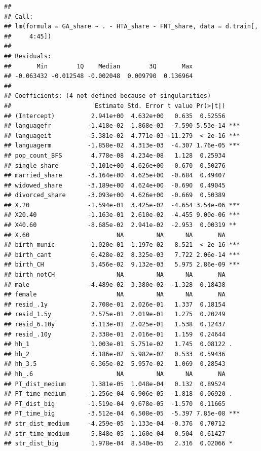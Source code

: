 \documentclass[
]{article}
\begin{document}
\begin{verbatim}
## 
## Call:
## lm(formula = GA_share ~ . - HTA_share - FNT_share, data = d.train[, 
##     4:45])
## 
## Residuals:
##       Min        1Q    Median        3Q       Max 
## -0.063432 -0.012548 -0.002048  0.009790  0.136964 
## 
## Coefficients: (4 not defined because of singularities)
##                       Estimate Std. Error t value Pr(>|t|)    
## (Intercept)          2.941e+00  4.632e+00   0.635  0.52556    
## languagefr          -1.418e-02  1.868e-03  -7.590 5.53e-14 ***
## languageit          -5.381e-02  4.771e-03 -11.279  < 2e-16 ***
## languagerm          -1.858e-02  4.313e-03  -4.307 1.76e-05 ***
## pop_count_BFS        4.778e-08  4.234e-08   1.128  0.25934    
## single_share        -3.101e+00  4.626e+00  -0.670  0.50276    
## married_share       -3.164e+00  4.625e+00  -0.684  0.49407    
## widowed_share       -3.189e+00  4.624e+00  -0.690  0.49045    
## divorced_share      -3.093e+00  4.626e+00  -0.669  0.50389    
## X.20                -1.594e-01  3.425e-02  -4.654 3.54e-06 ***
## X20.40              -1.163e-01  2.610e-02  -4.455 9.00e-06 ***
## X40.60              -8.685e-02  2.941e-02  -2.953  0.00319 ** 
## X.60                        NA         NA      NA       NA    
## birth_munic          1.020e-01  1.197e-02   8.521  < 2e-16 ***
## birth_cant           6.428e-02  8.325e-03   7.722 2.06e-14 ***
## birth_CH             5.456e-02  9.132e-03   5.975 2.86e-09 ***
## birth_notCH                 NA         NA      NA       NA    
## male                -4.489e-02  3.380e-02  -1.328  0.18438    
## female                      NA         NA      NA       NA    
## resid_.1y            2.708e-01  2.026e-01   1.337  0.18154    
## resid_1.5y           2.575e-01  2.019e-01   1.275  0.20249    
## resid_6.10y          3.113e-01  2.025e-01   1.538  0.12437    
## resid_.10y           2.338e-01  2.016e-01   1.159  0.24644    
## hh_1                 1.003e-01  5.751e-02   1.745  0.08122 .  
## hh_2                 3.186e-02  5.982e-02   0.533  0.59436    
## hh_3.5               6.365e-02  5.957e-02   1.069  0.28543    
## hh_.6                       NA         NA      NA       NA    
## PT_dist_medium       1.381e-05  1.048e-04   0.132  0.89524    
## PT_time_medium      -1.256e-04  6.906e-05  -1.818  0.06920 .  
## PT_dist_big         -1.519e-04  9.678e-05  -1.570  0.11665    
## PT_time_big         -3.512e-04  6.508e-05  -5.397 7.85e-08 ***
## str_dist_medium     -4.259e-05  1.133e-04  -0.376  0.70712    
## str_time_medium      5.848e-05  1.160e-04   0.504  0.61427    
## str_dist_big         1.978e-04  8.540e-05   2.316  0.02066 *  

\end{verbatim}
\end{document}
